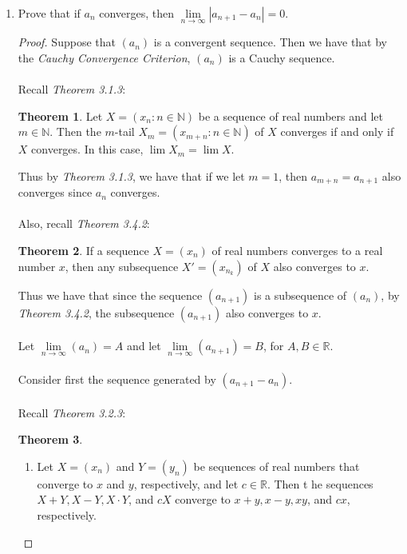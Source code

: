 \documentclass[12pt,letterpaper]{article}
\newcommand{\R}{\mathbb{R}}
\newcommand{\N}{\mathbb{N}}
\theoremstyle{case}
\theoremstyle{definition}
\newtheorem*{theorem*}{Theorem}
\begin{document}
\begin{enumerate}
\begin{enumerate}
			\item Prove that if $a_n$ converges, then $\lim\limits_{n \to \infty} |a_{n+1}-a_n|=0$.
			\begin{proof}
				Suppose that $(a_n)$ is a convergent sequence. Then we have that by the \textit{Cauchy Convergence Criterion}, $(a_n)$ is a Cauchy sequence.
				\\\\Recall \textit{Theorem 3.1.3}:
				\begin{theorem*}
					Let $X=(x_n:n \in \N)$ be a sequence of real numbers and let $m \in \N$. Then the $m$-tail $X_m=(x_{m+n}:n \in \N)$ of $X$ converges if and only if $X$ converges. In this case, $\lim X_m = \lim X$.
				\end{theorem*}
				Thus by \textit{Theorem 3.1.3}, we have that if we let $m=1$, then $a_{m+n}=a_{n+1}$ also converges since $a_n$ converges.
				\\\\Also, recall \textit{Theorem 3.4.2}:
				\begin{theorem*}
					If a sequence $X=(x_n)$ of real numbers converges to a real number $x$, then any subsequence $X'=(x_{n_k})$ of $X$ also converges to $x$.
				\end{theorem*}
				Thus we have that since the sequence $(a_{n+1})$ is a subsequence of $(a_n)$, by \textit{Theorem 3.4.2}, the subsequence $(a_{n+1})$ also converges to $x$.
				\\\\Let $\lim\limits_{n \to \infty} (a_n)=A$ and let $\lim\limits_{n \to \infty} (a_{n+1}) = B$, for $A,B \in \R$. 
				\\\\Consider first the sequence generated by $(a_{n+1}-a_n)$.
				\\\\Recall \textit{Theorem 3.2.3}:
				\begin{theorem*}
					\begin{enumerate}
						\item Let $X=(x_n)$ and $Y=(y_n)$ be sequences of real numbers that converge to $x$ and $y$, respectively, and let $c \in \R$. Then t he sequences $X+Y, X-Y, X \cdot Y$, and $cX$ converge to $x+y, x-y, xy$, and $cx$, respectively.
						

\end{enumerate}
\end{theorem*}
\end{proof}
\end{enumerate}
\end{enumerate}
\end{document}
